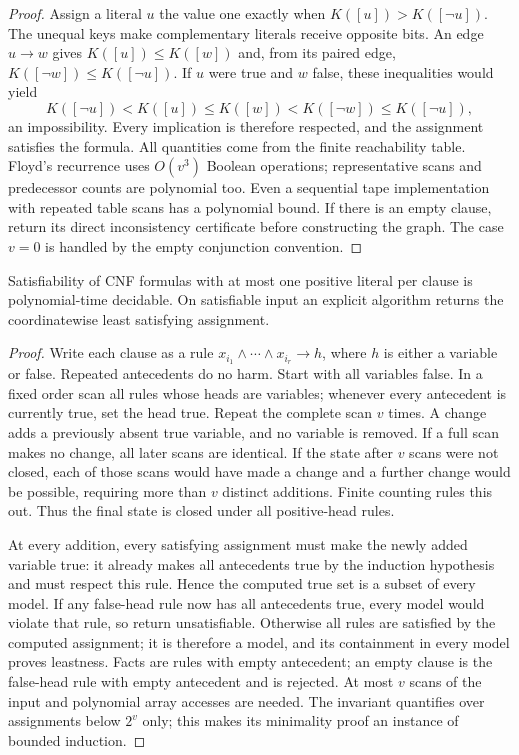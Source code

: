 \begin{proof}
Assign a literal $u$ the value one exactly when
$K([u])>K([\neg u])$. The unequal keys make complementary literals receive
opposite bits. An edge $u\to w$ gives
$K([u])\le K([w])$ and, from its paired edge,
$K([\neg w])\le K([\neg u])$. If $u$ were true and $w$ false, these
inequalities would yield
\[
 K([\neg u])<K([u])\le K([w])
 <K([\neg w])\le K([\neg u]),
\]
an impossibility. Every implication is therefore respected, and the
assignment satisfies the formula. All quantities come from the finite
reachability table. Floyd's recurrence uses $O(v^3)$ Boolean operations;
representative scans and predecessor counts are polynomial too. Even a
sequential tape implementation with repeated table scans has a polynomial
bound. If there is an empty clause, return its direct inconsistency
certificate before constructing the graph. The case $v=0$ is handled by the
empty conjunction convention.
\end{proof}

\begin{theorem}\label{thm:N14}
Satisfiability of CNF formulas with at most one positive literal per clause is
polynomial-time decidable. On satisfiable input an explicit algorithm returns
the coordinatewise least satisfying assignment.
\end{theorem}
\begin{proof}
Write each clause as a rule $x_{i_1}\wedge\cdots\wedge x_{i_r}\to h$,
where $h$ is either a variable or false. Repeated antecedents do no harm.
Start with all variables false. In a fixed order scan all rules whose heads
are variables; whenever every antecedent is currently true, set the head
true. Repeat the complete scan $v$ times. A change adds a previously absent
true variable, and no variable is removed. If a full scan makes no change,
all later scans are identical. If the state after $v$ scans were not closed,
each of those scans would have made a change and a further change would be
possible, requiring more than $v$ distinct additions. Finite counting rules
this out. Thus the final state is closed under all positive-head rules.

At every addition, every satisfying assignment must make the newly added
variable true: it already makes all antecedents true by the induction
hypothesis and must respect this rule. Hence the computed true set is a
subset of every model. If any false-head rule now has all antecedents true,
every model would violate that rule, so return unsatisfiable. Otherwise all
rules are satisfied by the computed assignment; it is therefore a model,
and its containment in every model proves leastness. Facts are rules with
empty antecedent; an empty clause is the false-head rule with empty
antecedent and is rejected. At most $v$ scans of the input and polynomial
array accesses are needed. The invariant quantifies over assignments below
$2^v$ only; this makes its minimality proof an instance of bounded induction.
\end{proof}

